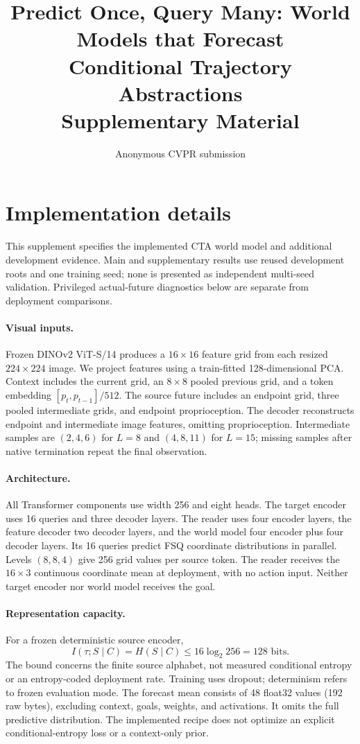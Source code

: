 \documentclass[10pt,twocolumn,letterpaper]{article}
\title{Predict Once, Query Many: World Models that Forecast\\Conditional Trajectory Abstractions\\Supplementary Material}
\author{Anonymous CVPR submission}
\begin{document}
\maketitle
\setcounter{section}{0}
\renewcommand{\thesection}{\Alph{section}}
\section{Implementation details}
This supplement specifies the implemented CTA world model and additional development evidence. Main and supplementary results use reused development roots and one training seed; none is presented as independent multi-seed validation. Privileged actual-future diagnostics below are separate from deployment comparisons.

\paragraph{Visual inputs.}
Frozen DINOv2 ViT-S/14 produces a $16\times16$ feature grid from each resized $224\times224$ image. We project features using a train-fitted 128-dimensional PCA. Context includes the current grid, an $8\times8$ pooled previous grid, and a token embedding $[p_t,p_{t-1}]/512$. The source future includes an endpoint grid, three pooled intermediate grids, and endpoint proprioception. The decoder reconstructs endpoint and intermediate image features, omitting proprioception. Intermediate samples are $(2,4,6)$ for $L=8$ and $(4,8,11)$ for $L=15$; missing samples after native termination repeat the final observation.

\paragraph{Architecture.}
All Transformer components use width 256 and eight heads. The target encoder uses 16 queries and three decoder layers. The reader uses four encoder layers, the feature decoder two decoder layers, and the world model four encoder plus four decoder layers. Its 16 queries predict FSQ coordinate distributions in parallel. Levels $(8,8,4)$ give 256 grid values per source token. The reader receives the $16\times3$ continuous coordinate mean at deployment, with no action input. Neither target encoder nor world model receives the goal.

\paragraph{Representation capacity.}
For a frozen deterministic source encoder,
\begin{equation}
I(\tau;S\mid C)=H(S\mid C)\le16\log_2 256=128\text{ bits}.
\end{equation}
The bound concerns the finite source alphabet, not measured conditional entropy or an entropy-coded deployment rate. Training uses dropout; determinism refers to frozen evaluation mode. The forecast mean consists of 48 float32 values (192 raw bytes), excluding context, goals, weights, and activations. It omits the full predictive distribution. The implemented recipe does not optimize an explicit conditional-entropy loss or a context-only prior.
\end{document}
